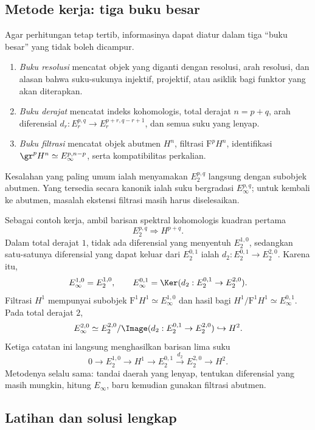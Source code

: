 \subsection*{Metode kerja: tiga buku besar}

Agar perhitungan tetap tertib, informasinya dapat diatur dalam tiga ``buku
besar'' yang tidak boleh dicampur.
\begin{enumerate}
	\item \emph{Buku resolusi} mencatat objek yang diganti dengan resolusi, arah resolusi,
	dan alasan bahwa suku-sukunya injektif, projektif, atau asiklik bagi funktor
	yang akan diterapkan.
	\item \emph{Buku derajat} mencatat indeks kohomologis, total derajat
	$n=p+q$, arah diferensial
	$d_r:E_r^{p,q}\to E_r^{p+r,q-r+1}$, dan semua suku yang lenyap.
	\item \emph{Buku filtrasi} mencatat objek abutmen $H^n$, filtrasi
	$\mathrm{F}^pH^n$, identifikasi
	$\gr^pH^n\simeq E_\infty^{p,n-p}$, serta kompatibilitas perkalian.
\end{enumerate}
Kesalahan yang paling umum ialah menyamakan $E_2^{p,q}$ langsung dengan
subobjek abutmen. Yang tersedia secara kanonik ialah suku bergradasi
$E_\infty^{p,q}$; untuk kembali ke abutmen, masalah ekstensi filtrasi masih
harus diselesaikan.

Sebagai contoh kerja, ambil barisan spektral kohomologis kuadran pertama
\[
	E_2^{p,q}\Rightarrow H^{p+q}.
\]
Dalam total derajat $1$, tidak ada diferensial yang menyentuh
$E_2^{1,0}$, sedangkan satu-satunya diferensial yang dapat keluar dari
$E_2^{0,1}$ ialah
$d_2:E_2^{0,1}\to E_2^{2,0}$. Karena itu,
\[
	E_\infty^{1,0}=E_2^{1,0},\qquad
	E_\infty^{0,1}=\Ker(d_2:E_2^{0,1}\to E_2^{2,0}).
\]
Filtrasi $H^1$ mempunyai subobjek
$\mathrm{F}^1H^1\simeq E_\infty^{1,0}$ dan hasil bagi
$H^1/\mathrm{F}^1H^1\simeq E_\infty^{0,1}$. Pada total derajat $2$,
\[
	E_\infty^{2,0}\simeq
	E_2^{2,0}/\Image(d_2:E_2^{0,1}\to E_2^{2,0})
	\hookrightarrow H^2.
\]
Ketiga catatan ini langsung menghasilkan barisan lima suku
\[
	0\to E_2^{1,0}\to H^1\to E_2^{0,1}
	\xrightarrow{d_2}E_2^{2,0}\to H^2.
\]
Metodenya selalu sama: tandai daerah yang lenyap, tentukan diferensial yang masih
mungkin, hitung $E_\infty$, baru kemudian gunakan filtrasi abutmen.

\subsection*{Latihan dan solusi lengkap}

